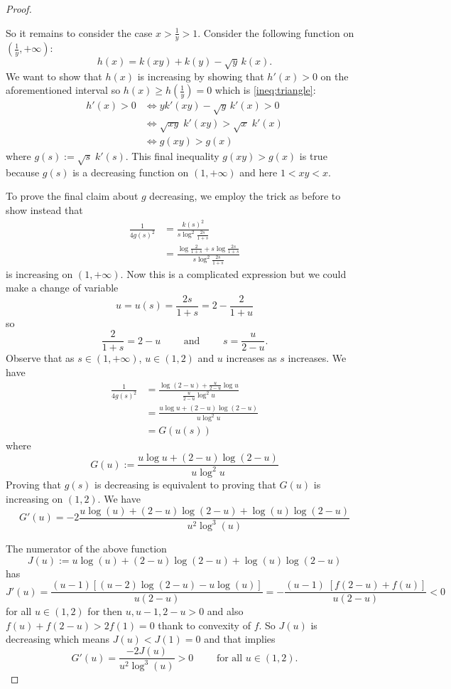 \documentclass[10pt]{amsart}
\begin{document}
\begin{proof}
\begin{itemize}
So it remains to consider the case $x > \frac{1}{y} > 1$. Consider the following function on $(\frac{1}{y}, +\infty)$:
$$h(x) = k(xy) + k(y) - \sqrt{y} \, k(x).$$
We want to show that $h(x)$ is increasing by showing that $h'(x) > 0$ on the aforementioned interval so $h(x) \geq h(\frac{1}{y}) = 0$ which is \eqref{ineq:triangle}:
\begin{align*}
h'(x) > 0 &\iff y k'(xy) - \sqrt{y} \, k'(x) > 0\\
&\iff \sqrt{xy} \; k'(xy) > \sqrt{x} \; k'(x)\\
&\iff g(xy) > g(x)
\end{align*}
where $g(s) := \sqrt{s} \; k'(s)$. This final inequality $g(xy) > g(x)$ is true because $g(s)$ is a decreasing function on $(1, +\infty)$ and here $1 < xy < x$.
\end{itemize}

To prove the final claim about $g$ decreasing, we employ the trick as before to show instead that
\begin{align*}
\frac{1}{4g(s)^2} &= \frac{k(s)^2}{s \log^2 \frac{2s}{1 + s}}\\
&= \frac{\log \frac{2}{1 + s} + s \log \frac{2s}{1 + s}}{s \log^2 \frac{2s}{1 + s}}
\end{align*}
is increasing on $(1, +\infty)$. Now this is a complicated expression but we could make a change of variable
$$u = u(s) = \frac{2s}{1 + s} = 2 - \frac{2}{1 + u}$$
so
$$\frac{2}{1+s} = 2 - u \qquad \text{ and } \qquad s = \frac{u}{2 - u}.$$
Observe that as $s \in (1, +\infty)$, $u \in (1, 2)$ and $u$ increases as $s$ increases. We have
\begin{align*}
\frac{1}{4g(s)^2} &= \frac{\log(2 - u) + \frac{u}{2 - u} \log u}{\frac{u}{2 - u} \log^2 u}\\
&= \frac{u \log u + (2-u) \log(2-u)}{u \log^2 u}\\
&= G(u(s))
\end{align*}
where
$$G(u) := \frac{u \log u + (2-u) \log(2-u)}{u \log^2 u}$$
Proving that $g(s)$ is decreasing is equivalent to proving that $G(u)$ is increasing on $(1, 2)$. We have
$$G'(u) = - 2 \frac{u \log(u) + (2 - u) \log(2 - u) + \log(u) \log(2 - u)}{u^2 \log^3 (u)}$$

The numerator of the above function
$$J(u) := u \log(u) + (2 - u) \log(2 - u) + \log(u) \log(2 - u)$$
has
$$J'(u) = \frac{(u - 1) \left[ (u - 2) \log(2 - u) - u \log(u) \right]}{u (2 - u)} = -\frac{(u - 1) \; [f(2-u) + f(u)]}{u(2-u)} < 0$$
for all $u \in (1, 2)$ for then $u, u - 1, 2 - u > 0$ and also $f(u) + f(2 - u) > 2 f(1) = 0$ thank to convexity of $f$. So $J(u)$ is decreasing which means $J(u) < J(1) = 0$ and that implies
$$G'(u) = \frac{-2J(u)}{u^2 \log^3(u)} > 0 \qquad \text{ for all } u \in (1, 2).$$
\end{proof}
\end{document}
